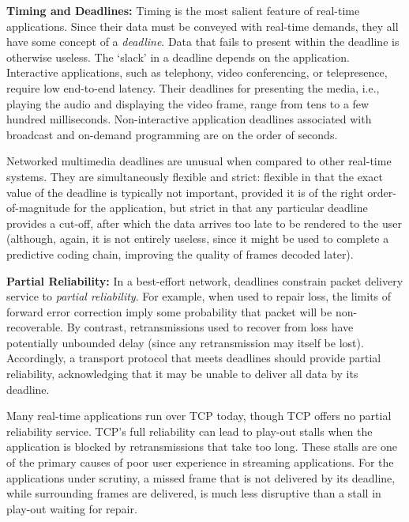 \documentclass{sig-alternate-05-2015}
\begin{document}
\textbf{Timing and Deadlines:}
Timing is the most salient feature of real-time applications. Since their data
must be conveyed with real-time demands, they all have some concept of a
\emph{deadline}. Data that fails to present within the deadline is otherwise
useless.
The `slack' in a deadline depends on the application. Interactive applications,
such as telephony, video conferencing, or telepresence, require low end-to-end
latency. Their deadlines for presenting the media, i.e., playing the audio and
displaying the video frame, range from tens to a few hundred milliseconds.
Non-interactive application deadlines associated with broadcast and on-demand
programming are on the order of seconds.

Networked multimedia deadlines are unusual when compared to other real-time
systems. They are simultaneously flexible and strict: flexible in that the exact
value of the deadline is typically not important, provided it is of the right
order-of-magnitude for the application, but strict in that any particular
deadline provides a cut-off, after which the data arrives too late to be
rendered to the user (although, again, it is not entirely useless, since
it might be used to complete a predictive coding chain, improving the quality 
of frames decoded later).

\textbf{Partial Reliability:}
In a best-effort network, deadlines
constrain packet delivery service to \emph{partial reliability}.
For example, when used to repair loss, the limits of forward error correction
imply some probability that packet will be non-recoverable. By contrast,
retransmissions used to recover from loss have potentially unbounded delay
(since any retransmission may itself be lost).
Accordingly, a transport protocol that meets deadlines should provide partial
reliability, acknowledging that it may be unable to deliver all data by its
deadline.

Many real-time applications run over TCP today, though TCP offers no partial
reliability service. TCP's full reliability can lead to play-out stalls
when the application is blocked by retransmissions that take too
long. These stalls are one of the primary causes of poor user experience in
streaming applications.
For the applications under scrutiny, a missed frame that is not delivered
by its deadline, while surrounding frames are delivered, is much less
disruptive than a stall in play-out waiting for repair.
\end{document}
